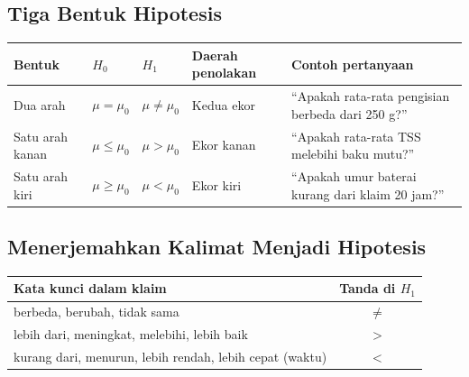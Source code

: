 \documentclass[
  indonesian,
  letterpaper,
]{book}
\newcounter{none} %
\begin{document}
\subsection{Tiga Bentuk Hipotesis}\label{tiga-bentuk-hipotesis}

{\def\LTcaptype{none} %
\begin{longtable}[]{@{}
  >{\raggedright\arraybackslash}p{}
  >{\raggedright\arraybackslash}p{}
  >{\raggedright\arraybackslash}p{}
  >{\raggedright\arraybackslash}p{}
  >{\raggedright\arraybackslash}p{}@{}}
\toprule\noalign{}
\begin{minipage}[b]{\linewidth}\raggedright
Bentuk
\end{minipage} & \begin{minipage}[b]{\linewidth}\raggedright
\(H_0\)
\end{minipage} & \begin{minipage}[b]{\linewidth}\raggedright
\(H_1\)
\end{minipage} & \begin{minipage}[b]{\linewidth}\raggedright
Daerah penolakan
\end{minipage} & \begin{minipage}[b]{\linewidth}\raggedright
Contoh pertanyaan
\end{minipage} \\
\midrule\noalign{}
\endhead
\bottomrule\noalign{}
\endlastfoot
Dua arah & \(\mu = \mu_0\) & \(\mu \ne \mu_0\) & Kedua ekor & ``Apakah
rata-rata pengisian berbeda dari 250 g?'' \\
Satu arah kanan & \(\mu \le \mu_0\) & \(\mu > \mu_0\) & Ekor kanan &
``Apakah rata-rata TSS melebihi baku mutu?'' \\
Satu arah kiri & \(\mu \ge \mu_0\) & \(\mu < \mu_0\) & Ekor kiri &
``Apakah umur baterai kurang dari klaim 20 jam?'' \\
\end{longtable}
}

\subsection{Menerjemahkan Kalimat Menjadi
Hipotesis}\label{menerjemahkan-kalimat-menjadi-hipotesis}

{\def\LTcaptype{none} %
\begin{longtable}[]{@{}lc@{}}
\toprule\noalign{}
Kata kunci dalam klaim & Tanda di \(H_1\) \\
\midrule\noalign{}
\endhead
\bottomrule\noalign{}
\endlastfoot
berbeda, berubah, tidak sama & \(\ne\) \\
lebih dari, meningkat, melebihi, lebih baik & \(>\) \\
kurang dari, menurun, lebih rendah, lebih cepat (waktu) & \(<\) \\
\end{longtable}
}
\end{document}
